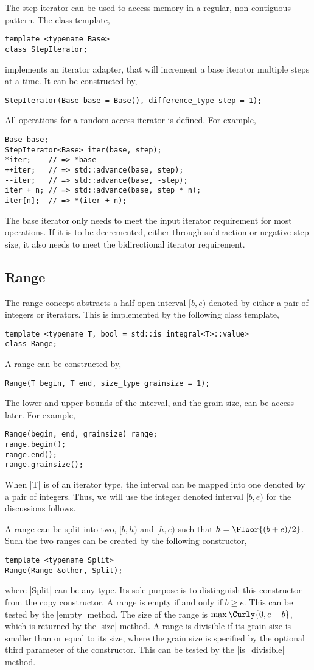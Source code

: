 The step iterator can be used to access memory in a regular, non-contiguous
pattern. The class template,
\begin{verbatim}
template <typename Base>
class StepIterator;
\end{verbatim}
implements an iterator adapter, that will increment a base iterator multiple
steps at a time. It can be constructed by,
\begin{verbatim}
StepIterator(Base base = Base(), difference_type step = 1);
\end{verbatim}
All operations for a random access iterator is defined. For example,
\begin{verbatim}
Base base;
StepIterator<Base> iter(base, step);
*iter;    // => *base
++iter;   // => std::advance(base, step);
--iter;   // => std::advance(base, -step);
iter + n; // => std::advance(base, step * n);
iter[n];  // => *(iter + n);
\end{verbatim}
The base iterator only needs to meet the input iterator requirement for most
operations. If it is to be decremented, either through subtraction or negative
step size, it also needs to meet the bidirectional iterator requirement.

\subsection{Range}
\label{sub:Range}

The range concept abstracts a half-open interval $[b, e)$ denoted by either a
pair of integers or iterators. This is implemented by the following class
template,
\begin{verbatim}
template <typename T, bool = std::is_integral<T>::value>
class Range;
\end{verbatim}
A range can be constructed by,
\begin{verbatim}
Range(T begin, T end, size_type grainsize = 1);
\end{verbatim}
The lower and upper bounds of the interval, and the grain size, can be access
later. For example,
\begin{verbatim}
Range(begin, end, grainsize) range;
range.begin();
range.end();
range.grainsize();
\end{verbatim}
When |T| is of an iterator type, the interval can be mapped into one denoted by
a pair of integers. Thus, we will use the integer denoted interval $[b, e)$ for
the discussions follows.

A range can be split into two, $[b, h)$ and $[h, e)$ such that $h = \Floor{(b +
  e) / 2}$. Such the two ranges can be created by the following constructor,
\begin{verbatim}
template <typename Split>
Range(Range &other, Split);
\end{verbatim}
where |Split| can be any type. Its sole purpose is to distinguish this
constructor from the copy constructor. A range is empty if and only if $b \ge
e$. This can be tested by the |empty| method. The size of the range is
$\max\Curly{0, e - b}$, which is returned by the |size| method. A range is
divisible if its grain size is smaller than or equal to its size, where the
grain size is specified by the optional third parameter of the constructor.
This can be tested by the |is_divisible| method.

